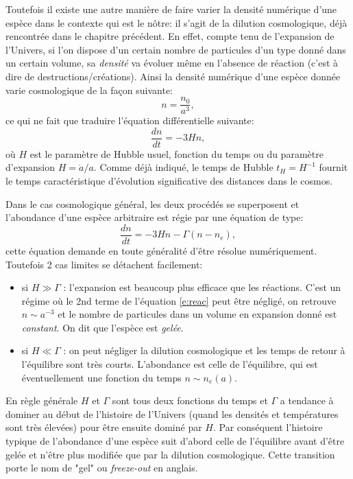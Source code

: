 Toutefois il existe une autre manière de faire varier la densité numérique d'une espèce dans le contexte qui est le nôtre: il s'agit de la dilution cosmologique, déjà rencontrée dans le chapitre précédent. En effet, compte tenu de l'expansion de l'Univers, si l'on dispose d'un certain nombre de particules d'un type donné dans un certain volume, sa \textit{densité} va évoluer même en l'absence de réaction (c'est à dire de destructions/créations). Ainsi la densité numérique d'une espèce donnée varie cosmologique de la façon suivante:
\begin{equation}
n=\frac{n_0}{a^3},
\end{equation}
ce qui ne fait que traduire l'équation différentielle suivante:
\begin{equation}
\frac{dn}{dt}=-3Hn,
\end{equation}
où $H$ est le paramètre de Hubble usuel, fonction du temps ou du paramètre d'expansion $H=\dot a/a$. Comme déjà indiqué, le temps de Hubble $t_H=H^{-1}$ fournit le temps caractéristique d'évolution significative des distances dans le cosmos.

Dans le cas cosmologique général, les deux procédés se superposent et l'abondance d'une espèce arbitraire est régie par une équation de type:
\begin{equation}
\frac{dn}{dt}=-3Hn-\Gamma (n-n_e),
\label{e:reac}
\end{equation}
cette équation demande en toute généralité d'être résolue numériquement. Toutefois 2 cas limites se détachent facilement:
\begin{itemize}
\item si $H\gg \Gamma$ : l'expansion est beaucoup plus efficace que les réactions. C'est un régime où le 2nd terme de l'équation \ref{e:reac} peut être négligé, on retrouve $n\sim a^{-3}$ et le nombre de particules dans un volume en expansion donné est \textit{constant}. On dit que l'espèce est \textit{gelée}.
\item si $H\ll \Gamma$ : on peut négliger la dilution cosmologique et les temps de retour à l'équilibre sont très courts. L'abondance est celle de l'équilibre, qui est éventuellement une fonction du temps $n\sim n_e(a)$.
\end{itemize}

En règle générale $H$ et $\Gamma$ sont tous deux fonctions du temps et $\Gamma$ a tendance à dominer au début de l'histoire de l'Univers (quand les densités et températures sont très élevées) pour être ensuite dominé par $H$. Par conséquent l'histoire typique de l'abondance d'une espèce suit d'abord celle de l'équilibre avant d'être gelée et n'être plus modifiée que par la dilution cosmologique. Cette transition porte le nom de "gel" ou \textit{freeze-out} en anglais.



